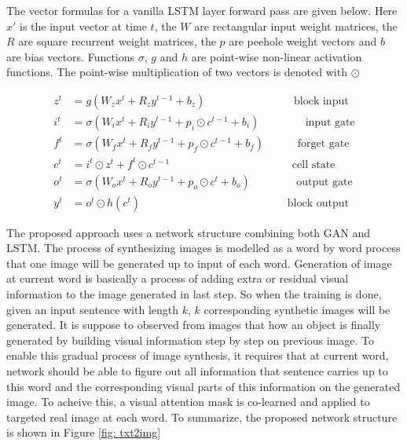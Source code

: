 \documentclass{iitthesis}
\begin{document}
The vector formulas for a vanilla LSTM layer forward pass are given below. Here $x'$ is the input vector at time $t$, the $W$ are rectangular input weight matrices, the $R$ are square recurrent weight matrices, the $p$ are peehole weight vectors and $b$ are bias vectors. Functions $\sigma$, $g$ and $h$ are point-wise non-linear activation functions. The point-wise multiplication of two vectors is denoted with $\odot$

\begin{align*}
z^t &= g(W_z x^t + R_z y^{t-1} + b_z) \;\;\;\;\;\;\;\;\;\;\;\;\;\;\;\;\;\;\;\;\;\;\;\;\;\;\;\;\;  \text{block input}\\
i^t &= \sigma(W_i x^t + R_i y^{t-1} + p_i \odot c^{t-1} + b_i) \;\;\;\;\;\;\;\;\;\;\;\;\;\;\;  \text{input gate}\\
f^t &= \sigma(W_f x^t + R_f y^{t-1} + p_f\odot c^{t-1} + b_f)\;\;\;\;\;\;\;\;\;\;\;  \text{forget gate}\\
c^t &= i^t \odot z^t + f^t \odot c^{t-1} \;\;\;\;\;\;\;\;\;\;\;\;\;\;\;\;\;\;\;\;\;\;\;\;\;\;\;\;\;\;\;\;\;\;\;\;\;\;\;\;  \text{cell state}\\
o^t &= \sigma(W_o x^t + R_o y^{t-1} + p_o \odot c^t + b_o) \;\;\;\;\;\;\;\;\;\;\;\;\;\;\;  \text{output gate}\\
y^t &= o^t \odot h(c^t) \;\;\;\;\;\;\;\;\;\;\;\;\;\;\;\;\;\;\;\;\;\;\;\;\;\;\;\;\;\;\;\;\;\;\;\;\;\;\;\;\;\;\;\;\;\;\;\;　\text{block output}
\end{align*}

 The proposed approach uses a network structure combining both GAN and LSTM. The process of synthesizing images is modelled as a word by word process that one image will be generated up to input of each word. Generation of image at current word is basically a process of adding extra or residual visual information to the image generated in last step. So when the training is done, given an input sentence with length $k$, $k$ corresponding synthetic images will be generated. It is suppose to observed from images that how an object is finally generated by building visual information step by step on previous image. To enable this gradual process of image synthesis, it requires that at current word, network should be able to figure out all information that sentence carries up to this word and the corresponding visual parts of this information on the generated image. To acheive this, a visual attention mask is co-learned and applied to targeted real image at each word. To summarize, the proposed network structure is shown in Figure \ref{fig: txt2img}
\end{document}
